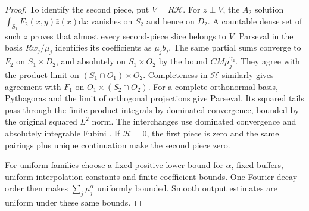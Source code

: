 \documentclass[11pt]{article}
\theoremstyle{definition}\newtheorem{definition}[theorem]{Definition}
\theoremstyle{remark}\newtheorem{remark}[theorem]{Remark}
\newcommand{\dd}{\mathrm d}
\begin{document}
\begin{proof}
To identify the second piece, put $V=\overline{R\mathcal H}$.
For $z\perp V$, the $A_2$ solution
$\int_{S_1}F_2(x,y)\bar z(x)\dd x$ vanishes on $S_2$ and hence on $D_2$.
A countable dense set of such $z$ proves that almost every second-piece
slice belongs to $V$. Parseval in the basis $Rw_j/\mu_j$ identifies its
coefficients as $\mu_jb_j$. The same partial sums converge to $F_2$ on
$S_1\times D_2$, and absolutely on $S_1\times O_2$ by the bound
$CM\mu_j^{\gamma_2}$. They agree with the product limit on
$(S_1\cap O_1)\times O_2$. Completeness in $\mathcal H$ similarly gives
agreement with $F_1$ on $O_1\times(S_2\cap O_2)$.
For a complete orthonormal basis, Pythagoras and the limit of orthogonal
projections give Parseval. Its squared tails pass through the finite
product integrals by dominated convergence, bounded by the original
squared $L^2$ norm. The interchanges use dominated convergence and
absolutely integrable Fubini
\cite[Theorems 18 and 23]{HunterMeasure}.
If $\mathcal H=0$, the first piece is zero and the same pairings plus
unique continuation make the second piece zero.

For uniform families choose a fixed positive lower bound for $\alpha$,
fixed buffers, uniform interpolation constants and finite coefficient
bounds. One Fourier decay order then makes $\sum_j\mu_j^\alpha$ uniformly
bounded. Smooth output estimates are uniform under these same bounds.
\end{proof}
\end{document}
